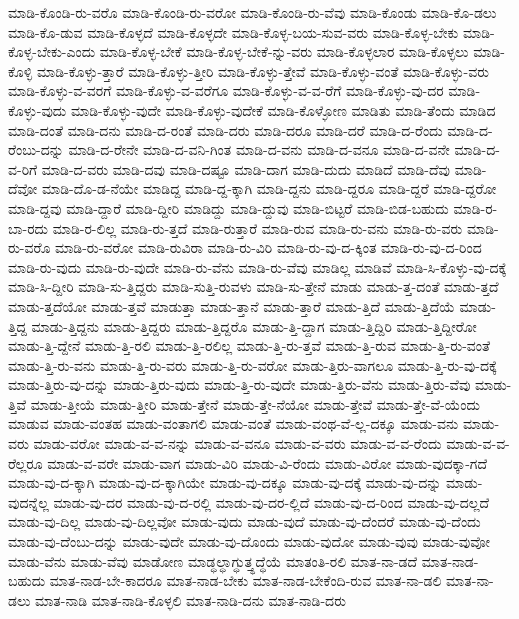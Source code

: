 {ಮಾಡಿ-ಕೊಂಡಿ-ರು-ವರೊ
ಮಾಡಿ-ಕೊಂಡಿ-ರು-ವರೋ
ಮಾಡಿ-ಕೊಂಡಿ-ರು-ವೆವು
ಮಾಡಿ-ಕೊಂಡು
ಮಾಡಿ-ಕೊ-ಡಲು
ಮಾಡಿ-ಕೊ-ಡುವ
ಮಾಡಿ-ಕೊಳ್ಳದೆ
ಮಾಡಿ-ಕೊಳ್ಳದೇ
ಮಾಡಿ-ಕೊಳ್ಳ-ಬಯ-ಸುವ-ವರು
ಮಾಡಿ-ಕೊಳ್ಳ-ಬೇಕು
ಮಾಡಿ-ಕೊಳ್ಳ-ಬೇಕು-ಎಂದು
ಮಾಡಿ-ಕೊಳ್ಳ-ಬೇಕೆ
ಮಾಡಿ-ಕೊಳ್ಳ-ಬೇಕೆ-ನ್ನು-ವರು
ಮಾಡಿ-ಕೊಳ್ಳಲಾರ
ಮಾಡಿ-ಕೊಳ್ಳಲು
ಮಾಡಿ-ಕೊಳ್ಳಿ
ಮಾಡಿ-ಕೊಳ್ಳು-ತ್ತಾರೆ
ಮಾಡಿ-ಕೊಳ್ಳು-ತ್ತೀರಿ
ಮಾಡಿ-ಕೊಳ್ಳು-ತ್ತೇವೆ
ಮಾಡಿ-ಕೊಳ್ಳು-ವಂತೆ
ಮಾಡಿ-ಕೊಳ್ಳು-ವರು
ಮಾಡಿ-ಕೊಳ್ಳು-ವ-ವರಗೆ
ಮಾಡಿ-ಕೊಳ್ಳು-ವ-ವರೆಗೂ
ಮಾಡಿ-ಕೊಳ್ಳು-ವ-ವ-ರೆಗೆ
ಮಾಡಿ-ಕೊಳ್ಳು-ವು-ದರ
ಮಾಡಿ-ಕೊಳ್ಳು-ವುದು
ಮಾಡಿ-ಕೊಳ್ಳು-ವುದೇ
ಮಾಡಿ-ಕೊಳ್ಳು-ವುದೇಕೆ
ಮಾಡಿ-ಕೊಳ್ಳೋಣ
ಮಾಡಿತು
ಮಾಡಿ-ತೆಂದು
ಮಾಡಿದ
ಮಾಡಿ-ದಂತೆ
ಮಾಡಿ-ದನು
ಮಾಡಿ-ದ-ರಂತೆ
ಮಾಡಿ-ದರು
ಮಾಡಿ-ದರೂ
ಮಾಡಿ-ದರೆ
ಮಾಡಿ-ದ-ರೆಂದು
ಮಾಡಿ-ದ-ರೆಂಬು-ದನ್ನು
ಮಾಡಿ-ದ-ರೇನೇ
ಮಾಡಿ-ದ-ವನಿ-ಗಿಂತ
ಮಾಡಿ-ದ-ವನು
ಮಾಡಿ-ದ-ವನೂ
ಮಾಡಿ-ದ-ವನೇ
ಮಾಡಿ-ದ-ವ-ರಿಗೆ
ಮಾಡಿ-ದ-ವರು
ಮಾಡಿ-ದವು
ಮಾಡಿ-ದಷ್ಟೂ
ಮಾಡಿ-ದಾಗ
ಮಾಡಿ-ದುದು
ಮಾಡಿದೆ
ಮಾಡಿ-ದೆವು
ಮಾಡಿ-ದೆವೋ
ಮಾಡಿ-ದೊ-ಡ-ನೆಯೇ
ಮಾಡಿದ್ದ
ಮಾಡಿ-ದ್ದ-ಕ್ಕಾಗಿ
ಮಾಡಿ-ದ್ದನು
ಮಾಡಿ-ದ್ದರೂ
ಮಾಡಿ-ದ್ದರೆ
ಮಾಡಿ-ದ್ದರೋ
ಮಾಡಿ-ದ್ದವು
ಮಾಡಿ-ದ್ದಾರೆ
ಮಾಡಿ-ದ್ದೀರಿ
ಮಾಡಿದ್ದು
ಮಾಡಿ-ದ್ದುವು
ಮಾಡಿ-ಬಿಟ್ಟರೆ
ಮಾಡಿ-ಬಿಡ-ಬಹುದು
ಮಾಡಿ-ರ-ಬಾ-ರದು
ಮಾಡಿ-ರ-ಲಿಲ್ಲ
ಮಾಡಿ-ರು-ತ್ತದೆ
ಮಾಡಿ-ರುತ್ತಾರೆ
ಮಾಡಿ-ರುವ
ಮಾಡಿ-ರು-ವನು
ಮಾಡಿ-ರು-ವರು
ಮಾಡಿ-ರು-ವರೊ
ಮಾಡಿ-ರು-ವರೋ
ಮಾಡಿ-ರುವಿರಾ
ಮಾಡಿ-ರು-ವಿರಿ
ಮಾಡಿ-ರು-ವು-ದ-ಕ್ಕಿಂತ
ಮಾಡಿ-ರು-ವು-ದ-ರಿಂದ
ಮಾಡಿ-ರು-ವುದು
ಮಾಡಿ-ರು-ವುದೇ
ಮಾಡಿ-ರು-ವೆನು
ಮಾಡಿ-ರು-ವೆವು
ಮಾಡಿಲ್ಲ
ಮಾಡಿವೆ
ಮಾಡಿ-ಸಿ-ಕೊಳ್ಳು-ವು-ದಕ್ಕೆ
ಮಾಡಿ-ಸಿ-ದ್ದೀರಿ
ಮಾಡಿ-ಸು-ತ್ತಿದ್ದರು
ಮಾಡಿ-ಸುತ್ತಿ-ರುವಳು
ಮಾಡಿ-ಸು-ತ್ತೇನೆ
ಮಾಡು
ಮಾಡು-ತ್ತ-ದಂತೆ
ಮಾಡು-ತ್ತದೆ
ಮಾಡು-ತ್ತದೆಯೋ
ಮಾಡು-ತ್ತವೆ
ಮಾಡುತ್ತಾ
ಮಾಡು-ತ್ತಾನೆ
ಮಾಡು-ತ್ತಾರೆ
ಮಾಡು-ತ್ತಿದೆ
ಮಾಡು-ತ್ತಿದೆಯೆ
ಮಾಡು-ತ್ತಿದ್ದ
ಮಾಡು-ತ್ತಿದ್ದನು
ಮಾಡು-ತ್ತಿದ್ದರು
ಮಾಡು-ತ್ತಿದ್ದರೊ
ಮಾಡು-ತ್ತಿ-ದ್ದಾಗ
ಮಾಡು-ತ್ತಿದ್ದಿರಿ
ಮಾಡು-ತ್ತಿದ್ದೀರೋ
ಮಾಡು-ತ್ತಿ-ದ್ದೇನೆ
ಮಾಡು-ತ್ತಿ-ರಲಿ
ಮಾಡು-ತ್ತಿ-ರಲಿಲ್ಲ
ಮಾಡು-ತ್ತಿ-ರು-ತ್ತವೆ
ಮಾಡು-ತ್ತಿ-ರುವ
ಮಾಡು-ತ್ತಿ-ರು-ವಂತೆ
ಮಾಡು-ತ್ತಿ-ರು-ವನು
ಮಾಡು-ತ್ತಿ-ರು-ವರು
ಮಾಡು-ತ್ತಿ-ರು-ವರೋ
ಮಾಡು-ತ್ತಿರು-ವಾಗಲೂ
ಮಾಡು-ತ್ತಿ-ರು-ವು-ದಕ್ಕೆ
ಮಾಡು-ತ್ತಿರು-ವು-ದನ್ನು
ಮಾಡು-ತ್ತಿರು-ವುದು
ಮಾಡು-ತ್ತಿ-ರು-ವುದೇ
ಮಾಡು-ತ್ತಿರು-ವೆನು
ಮಾಡು-ತ್ತಿರು-ವೆವು
ಮಾಡು-ತ್ತಿವೆ
ಮಾಡು-ತ್ತೀಯೆ
ಮಾಡು-ತ್ತೀರಿ
ಮಾಡು-ತ್ತೇನೆ
ಮಾಡು-ತ್ತೇ-ನೆಯೋ
ಮಾಡು-ತ್ತೇವೆ
ಮಾಡು-ತ್ತೇ-ವೆ-ಯೆಂದು
ಮಾಡುವ
ಮಾಡು-ವಂತಹ
ಮಾಡು-ವಂತಾಗಲಿ
ಮಾಡು-ವಂತೆ
ಮಾಡು-ವಂಥ-ವೆ-ಲ್ಲ-ದಕ್ಕೂ
ಮಾಡು-ವನು
ಮಾಡು-ವರು
ಮಾಡು-ವರೋ
ಮಾಡು-ವ-ವ-ನನ್ನು
ಮಾಡು-ವ-ವನೂ
ಮಾಡು-ವ-ವರು
ಮಾಡು-ವ-ವ-ರೆಂದು
ಮಾಡು-ವ-ವ-ರೆಲ್ಲರೂ
ಮಾಡು-ವ-ವರೇ
ಮಾಡು-ವಾಗ
ಮಾಡು-ವಿರಿ
ಮಾಡು-ವಿ-ರೆಂದು
ಮಾಡು-ವಿರೋ
ಮಾಡು-ವುದಕ್ಕಾ-ಗದೆ
ಮಾಡು-ವು-ದ-ಕ್ಕಾಗಿ
ಮಾಡು-ವು-ದ-ಕ್ಕಾಗಿಯೇ
ಮಾಡು-ವು-ದಕ್ಕೂ
ಮಾಡು-ವು-ದಕ್ಕೆ
ಮಾಡು-ವು-ದನ್ನು
ಮಾಡು-ವುದನ್ನೆಲ್ಲ
ಮಾಡು-ವು-ದರ
ಮಾಡು-ವು-ದ-ರಲ್ಲಿ
ಮಾಡು-ವು-ದರ-ಲ್ಲಿದೆ
ಮಾಡು-ವು-ದ-ರಿಂದ
ಮಾಡು-ವು-ದಲ್ಲದೆ
ಮಾಡು-ವು-ದಿಲ್ಲ
ಮಾಡು-ವು-ದಿಲ್ಲವೋ
ಮಾಡು-ವುದು
ಮಾಡು-ವುದೆ
ಮಾಡು-ವು-ದೆಂದರೆ
ಮಾಡು-ವು-ದೆಂದು
ಮಾಡು-ವು-ದೆಂಬು-ದನ್ನು
ಮಾಡು-ವುದೇ
ಮಾಡು-ವು-ದೊಂದು
ಮಾಡು-ವುದೋ
ಮಾಡು-ವುವು
ಮಾಡು-ವುವೋ
ಮಾಡು-ವೆನು
ಮಾಡು-ವೆವು
ಮಾಡೋಣ
ಮಾಡ್ಧಲ್ಧಾಗ್ಧುತ್ತ್ಧದ್ಧೆಯೆ
ಮಾತಂತಿ-ರಲಿ
ಮಾತ-ನಾ-ಡದೆ
ಮಾತ-ನಾಡ-ಬಹುದು
ಮಾತ-ನಾಡ-ಬೇ-ಕಾದರೂ
ಮಾತ-ನಾಡ-ಬೇಕು
ಮಾತ-ನಾಡ-ಬೇಕೆಂದಿ-ರುವ
ಮಾತ-ನಾ-ಡಲಿ
ಮಾತ-ನಾ-ಡಲು
ಮಾತ-ನಾಡಿ
ಮಾತ-ನಾಡಿ-ಕೊಳ್ಳಲಿ
ಮಾತ-ನಾಡಿ-ದನು
ಮಾತ-ನಾಡಿ-ದರು
}
